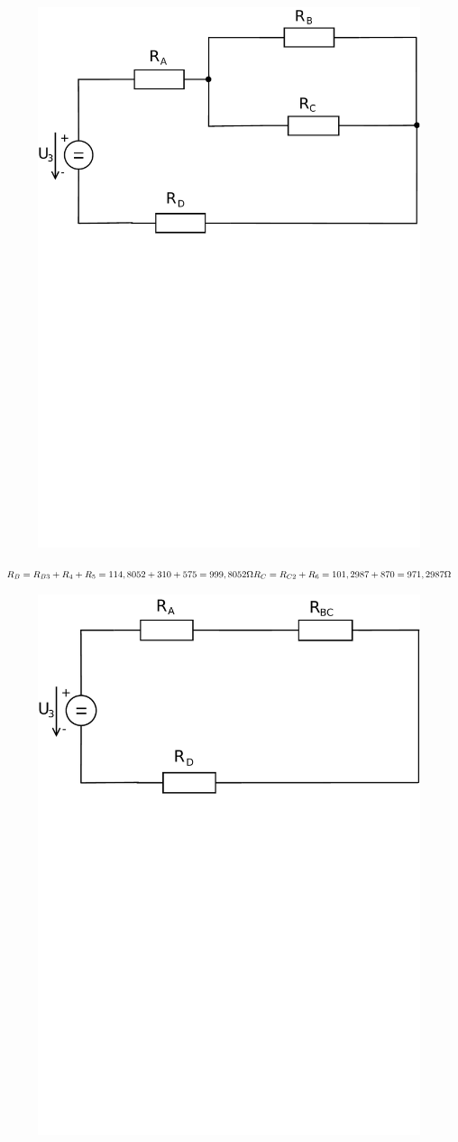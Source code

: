 \documentclass[12pt,a4paper]{article}         %
\begin{document}
    \begin{figure}[H] 
		\vspace{-0.6cm}
		\center\includegraphics[trim={0 14cm 0 0},clip,width=0.6\linewidth]{obr/1_4}
    \end{figure}
    
    {\Large
        \begin{math}\\
        R_B = R_{B3} + R_4 +R_5 = 114,8052 + 310 + 575 = 999,8052 {\Omega}\\
        R_C = R_{C2} + R_6 = 101,2987 + 870 = 971,2987 {\Omega}\\
        \end{math}
    }

    
    \begin{figure}[H] 
		\vspace{-0.6cm}
		\center\includegraphics[trim={0 14cm 0 0},clip,width=0.6\linewidth]{obr/1_5}
    \end{figure}
    
\end{document}
